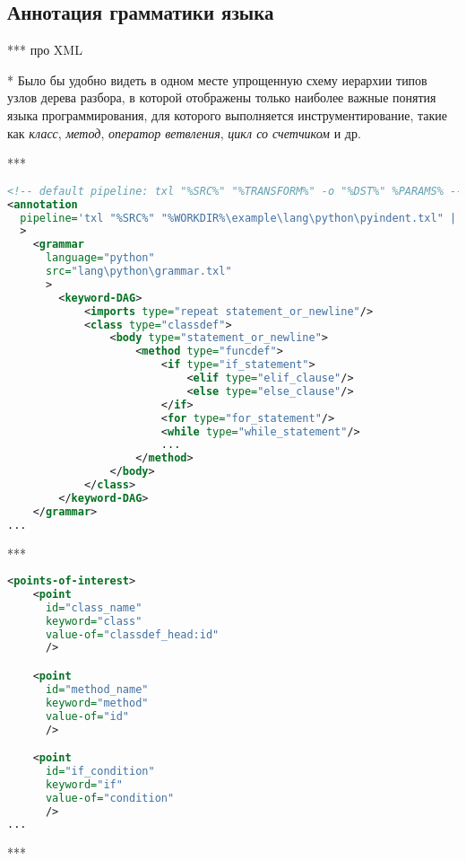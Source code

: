\subsection{Аннотация грамматики языка}

***
про XML

* Было бы удобно видеть в одном месте упрощенную схему иерархии типов узлов дерева разбора, в которой отображены только наиболее важные понятия языка программирования, для которого выполняется инструментирование, такие как \textit{класс}, \textit{метод}, \textit{оператор ветвления}, \textit{цикл со счетчиком} и др.

***

\begin{lstlisting}[frame=single, language=XML, label={annotation-dag-example}, caption={Пример}]
<!-- default pipeline: txl "%SRC%" "%TRANSFORM%" -o "%DST%" %PARAMS% -->
<annotation
  pipeline='txl "%SRC%" "%WORKDIR%\example\lang\python\pyindent.txl" | txl stdin "%TRANSFORM%" -o "%DST%" %PARAMS%'
  >
    <grammar
      language="python"
      src="lang\python\grammar.txl"
      >
        <keyword-DAG>
            <imports type="repeat statement_or_newline"/>
            <class type="classdef">
                <body type="statement_or_newline">
                    <method type="funcdef">
                        <if type="if_statement">
                            <elif type="elif_clause"/>
                            <else type="else_clause"/>
                        </if>
                        <for type="for_statement"/>
                        <while type="while_statement"/>
                        ...
                    </method>
                </body>
            </class>
        </keyword-DAG>
    </grammar>
...
\end{lstlisting}

***

\begin{lstlisting}[frame=single, language=XML, label={annotation-pois-example}, caption={Пример}]
<points-of-interest>
    <point
      id="class_name"
      keyword="class"
      value-of="classdef_head:id"
      />

    <point
      id="method_name"
      keyword="method"
      value-of="id"
      />

    <point
      id="if_condition"
      keyword="if"
      value-of="condition"
      />
...
\end{lstlisting}

***

